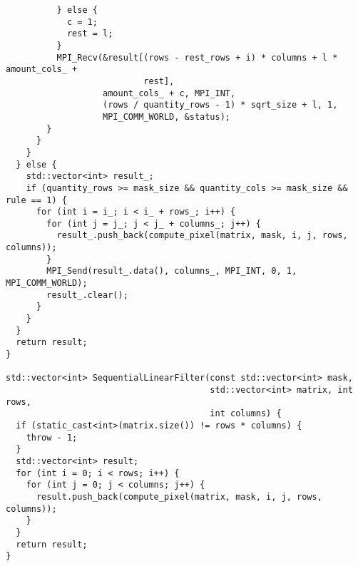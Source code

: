 \documentclass{report}
\begin{document}
\begin{lstlisting}
          } else {
            c = 1;
            rest = l;
          }
          MPI_Recv(&result[(rows - rest_rows + i) * columns + l * amount_cols_ +
                           rest],
                   amount_cols_ + c, MPI_INT,
                   (rows / quantity_rows - 1) * sqrt_size + l, 1,
                   MPI_COMM_WORLD, &status);
        }
      }
    }
  } else {
    std::vector<int> result_;
    if (quantity_rows >= mask_size && quantity_cols >= mask_size && rule == 1) {
      for (int i = i_; i < i_ + rows_; i++) {
        for (int j = j_; j < j_ + columns_; j++) {
          result_.push_back(compute_pixel(matrix, mask, i, j, rows, columns));
        }
        MPI_Send(result_.data(), columns_, MPI_INT, 0, 1, MPI_COMM_WORLD);
        result_.clear();
      }
    }
  }
  return result;
}

std::vector<int> SequentialLinearFilter(const std::vector<int> mask,
                                        std::vector<int> matrix, int rows,
                                        int columns) {
  if (static_cast<int>(matrix.size()) != rows * columns) {
    throw - 1;
  }
  std::vector<int> result;
  for (int i = 0; i < rows; i++) {
    for (int j = 0; j < columns; j++) {
      result.push_back(compute_pixel(matrix, mask, i, j, rows, columns));
    }
  }
  return result;
}
\end{lstlisting}
\end{document}
